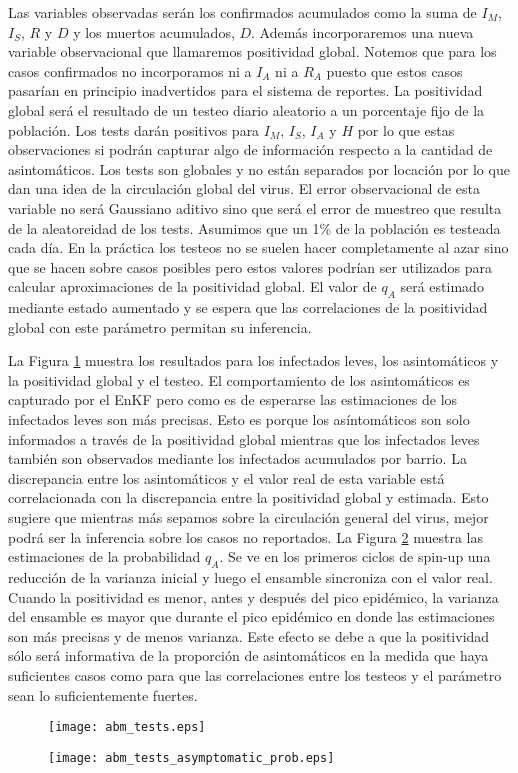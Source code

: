 Las variables observadas serán los confirmados acumulados como la suma de $I_M$, $I_S$, $R$ y $D$ y los muertos acumulados, $D$. Además incorporaremos una nueva variable observacional que llamaremos positividad global. Notemos que para los casos confirmados no incorporamos ni a $I_A$ ni a $R_A$ puesto que estos casos pasarían en principio inadvertidos para el sistema de reportes. La positividad global será el resultado de un testeo diario aleatorio a un porcentaje fijo de la población. Los tests darán positivos para $I_M$, $I_S$, $I_A$ y $H$ por lo que estas observaciones si podrán capturar algo de información respecto a la cantidad de asintomáticos. Los tests son globales y no están separados por locación por lo que dan una idea de la circulación global del virus. El error observacional de esta variable no será Gaussiano aditivo sino que será el error de muestreo que resulta de la aleatoreidad de los tests. Asumimos que un 1\% de la población es testeada cada día. En la práctica los testeos no se suelen hacer completamente al azar sino que se hacen sobre casos posibles pero estos valores podrían ser utilizados para calcular aproximaciones de la positividad global. El valor de $q_A$ será estimado mediante estado aumentado y se espera que las correlaciones de la positividad global con este parámetro permitan su inferencia.

La Figura \ref{fig:abm_tests} muestra los resultados para los infectados leves, los asintomáticos y la positividad global y el testeo. El comportamiento de los asintomáticos es capturado por el EnKF pero como es de esperarse las estimaciones de los infectados leves son más precisas. Esto es porque los asíntomáticos son solo informados a través de la positividad global
mientras que los infectados leves también son observados mediante los infectados acumulados por barrio. La discrepancia entre los asintomáticos y el valor real de esta variable está correlacionada con la discrepancia entre la positividad global y estimada. Esto sugiere que mientras más sepamos sobre la circulación general del virus, mejor podrá ser la inferencia sobre los casos no reportados. La Figura \ref{fig:abm_tests_asymptomatic_prob} muestra las estimaciones de la probabilidad $q_A$. Se ve en los primeros ciclos de spin-up una reducción de la varianza inicial y luego el ensamble sincroniza con el valor real. Cuando la positividad es menor, antes y después del pico epidémico, la varianza del ensamble es mayor que durante el pico epidémico en donde las estimaciones son más precisas y de menos varianza. Este efecto se debe a que la positividad sólo será informativa de la proporción de asintomáticos en la medida que haya suficientes casos como para que las correlaciones entre los testeos y el parámetro sean lo suficientemente fuertes.
\begin{figure}[h]
    \centering
    \texttt{[image: abm\_tests.eps]}
    \caption{}
    \label{fig:abm_tests}
\end{figure}
\begin{figure}[h]
    \centering
    \texttt{[image: abm\_tests\_asymptomatic\_prob.eps]}
    \caption{}
    \label{fig:abm_tests_asymptomatic_prob}
\end{figure}

